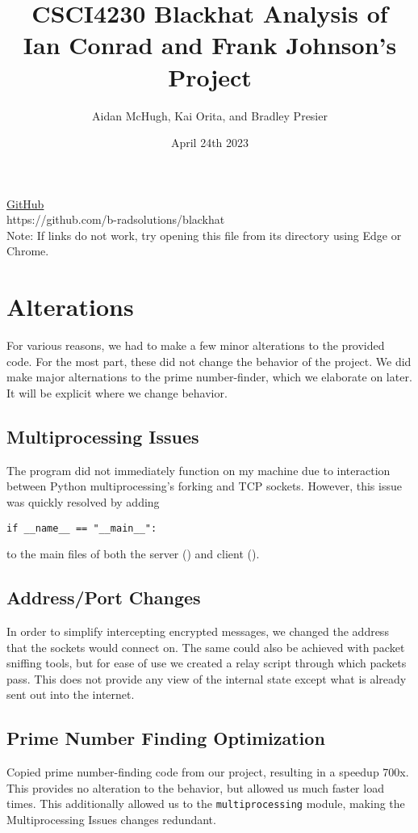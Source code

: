 \documentclass{article}
\title{CSCI4230 Blackhat Analysis of \\ Ian Conrad and Frank Johnson's Project}
\author{Aidan McHugh, Kai Orita, and Bradley Presier}
\date{April 24th 2023}
\newcommand{\code}[1]{\tcbox[
    on line,
    colback=codebackground, boxsep=2pt,
    colframe=white, boxrule=0pt,
    top=0pt, bottom=0pt, left=0pt, right=0pt
]{\texttt{#1}}}
\newcommand{\codebox}[1]{\begin{tcolorbox}[
    colback=codebackground, boxsep=2pt,
    colframe=white, boxrule=0pt,
    top=0pt, bottom=0pt, left=0pt, right=0pt
]\texttt{#1}
\end{tcolorbox}}
\begin{document}
\maketitle
\begin{center}
        \href{https://github.com/b-radsolutions/blackhat}{GitHub \faGithub} \\
        https://github.com/b-radsolutions/blackhat \\
        \vspace*{30em}Note: If links do not work, try opening this file from its directory using Edge or Chrome.
    \end{center}
\newpage
\tableofcontents
\newpage

\section{Alterations}
For various reasons, we had to make a few minor alterations to the provided code. For the most part, these did not change the behavior of the project. We did make major alternations to the prime number-finder, which we elaborate on later. It will be explicit where we change behavior.

\subsection{Multiprocessing Issues}
The program did not immediately function on my machine due to interaction between Python multiprocessing's forking and TCP sockets.
However, this issue was quickly resolved by adding
\codebox{if \_\_name\_\_ == "\_\_main\_\_":}
to the main files of both the server (\code{SERVER\_main.py}) and client (\code{CLIENT\_main.py}).

\subsection{Address/Port Changes}
In order to simplify intercepting encrypted messages, we changed the address that the sockets would connect on.
The same could also be achieved with packet sniffing tools,
but for ease of use we created a relay script through which packets pass.
This does not provide any view of the internal state except what is already sent out into the internet.

\subsection{Prime Number Finding Optimization}
Copied prime number-finding code from our project, resulting in a speedup 700x.
This provides no alteration to the behavior, but allowed us much faster load times.
This additionally allowed us to the \texttt{multiprocessing} module, making the Multiprocessing Issues changes redundant.
\end{document}
